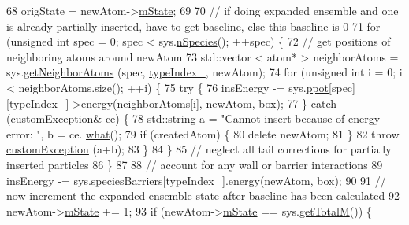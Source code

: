 \begin{DoxyCode}
68             origState = newAtom->\hyperlink{classatom_a3cb00c0c5b7533657e05af6ff4a42740}{mState};
69 
70             \textcolor{comment}{// if doing expanded ensemble and one is already partially inserted, have to get baseline, else
       this baseline is 0}
71             \textcolor{keywordflow}{for} (\textcolor{keywordtype}{unsigned} \textcolor{keywordtype}{int} spec = 0; spec < sys.\hyperlink{classsim_system_ab5e2e9b6204de15520302fe1d51688dd}{nSpecies}(); ++spec) \{
72                 \textcolor{comment}{// get positions of neighboring atoms around newAtom}
73                 std::vector < atom* > neighborAtoms = sys.\hyperlink{classsim_system_a9b3aeefa22c3b50b5913df6eea753bc6}{getNeighborAtoms} (spec, 
      \hyperlink{classmc_move_acb731965547b0326ef318ec96da8b46a}{typeIndex\_}, newAtom);
74                     \textcolor{keywordflow}{for} (\textcolor{keywordtype}{unsigned} \textcolor{keywordtype}{int} i = 0; i < neighborAtoms.size(); ++i) \{
75                     \textcolor{keywordflow}{try} \{
76                         insEnergy -= sys.\hyperlink{classsim_system_ad2e290b5963f132e6a3a56cee35c8e9f}{ppot}[spec][\hyperlink{classmc_move_acb731965547b0326ef318ec96da8b46a}{typeIndex\_}]->energy(neighborAtoms[i], 
      newAtom, box);
77                     \} \textcolor{keywordflow}{catch} (\hyperlink{classcustom_exception}{customException}& ce) \{
78                         std::string a = \textcolor{stringliteral}{"Cannot insert because of energy error: "}, b = ce.
      \hyperlink{classcustom_exception_aeb6ab5848b038adfc68fde86a512f691}{what}();
79                         \textcolor{keywordflow}{if} (createdAtom) \{
80                             \textcolor{keyword}{delete} newAtom;
81                         \}
82                         \textcolor{keywordflow}{throw} \hyperlink{classcustom_exception}{customException} (a+b);
83                     \}
84                     \}
85                     \textcolor{comment}{// neglect all tail corrections for partially inserted particles}
86             \}
87 
88             \textcolor{comment}{// account for any wall or barrier interactions}
89             insEnergy -= sys.\hyperlink{classsim_system_a5ae652ff4519f39c3862abae32a9581b}{speciesBarriers}[\hyperlink{classmc_move_acb731965547b0326ef318ec96da8b46a}{typeIndex\_}].energy(newAtom, box);
90 
91             \textcolor{comment}{// now increment the expanded ensemble state after baseline has been calculated}
92             newAtom->\hyperlink{classatom_a3cb00c0c5b7533657e05af6ff4a42740}{mState} += 1;
93             \textcolor{keywordflow}{if} (newAtom->\hyperlink{classatom_a3cb00c0c5b7533657e05af6ff4a42740}{mState} == sys.\hyperlink{classsim_system_aa4ad1afff101bb530e1590df05035276}{getTotalM}()) \{

\end{DoxyCode}
